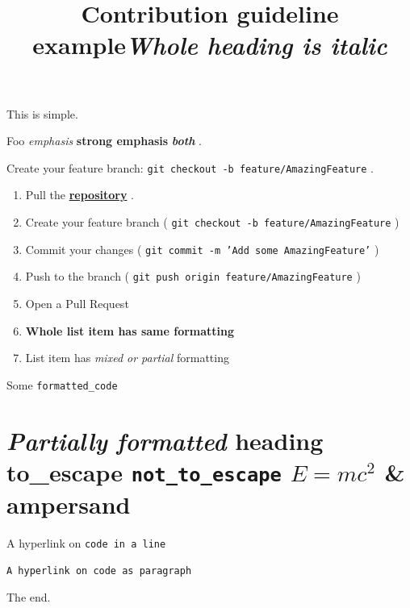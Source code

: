\documentclass[11pt,a4paper]{article}
\title{Contribution guideline example}
\begin{document}
\maketitle

This is simple.

Foo \textit{emphasis} \textbf{strong emphasis} \textit{\textbf{both}} .

Create your feature branch: \texttt{git checkout -b feature/AmazingFeature} .

\begin{enumerate}
\item Pull the \href{https://github.com/docling-project/docling}{\textbf{repository}} .
\item Create your feature branch ( \texttt{git checkout -b feature/AmazingFeature} )
\item Commit your changes ( \texttt{git commit -m 'Add some AmazingFeature'} )
\item Push to the branch ( \texttt{git push origin feature/AmazingFeature} )
\item Open a Pull Request
\item \textbf{Whole list item has same formatting}
\item List item has \textit{mixed or partial} formatting
\end{enumerate}

\title{\textit{Whole heading is italic}}

Some \texttt{formatted_code}

\section{\textit{Partially formatted} heading to\_escape \texttt{not_to_escape} $E=mc^2$ \& ampersand}

A hyperlink on \texttt{code in a line}

\begin{verbatim}
A hyperlink on code as paragraph
\end{verbatim}

The end.
\end{document}
